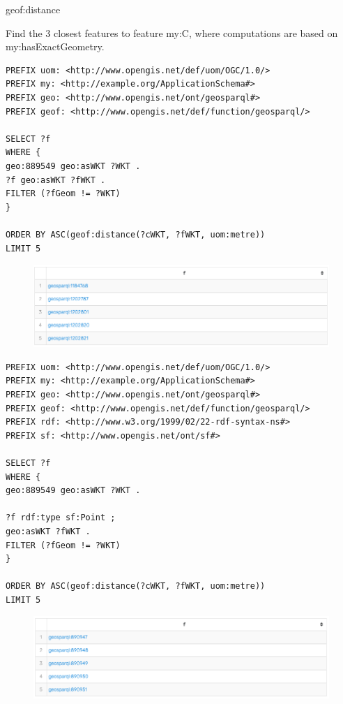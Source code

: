 geof:distance

Find the 3 closest features to feature my:C, where computations are based on my:hasExactGeometry.

\begin{lstlisting}
PREFIX uom: <http://www.opengis.net/def/uom/OGC/1.0/>
PREFIX my: <http://example.org/ApplicationSchema#>
PREFIX geo: <http://www.opengis.net/ont/geosparql#>
PREFIX geof: <http://www.opengis.net/def/function/geosparql/>

SELECT ?f
WHERE {
geo:889549 geo:asWKT ?WKT .
?f geo:asWKT ?fWKT .
FILTER (?fGeom != ?WKT)
}

ORDER BY ASC(geof:distance(?cWKT, ?fWKT, uom:metre))
LIMIT 5
\end{lstlisting}

\begin{figure}[H]
	\centering
	\includegraphics[width=0.7\linewidth]{imagenes/capitulo4/salida8}
	\caption{}
	\label{fig:salida8}
\end{figure}


\begin{lstlisting}
PREFIX uom: <http://www.opengis.net/def/uom/OGC/1.0/>
PREFIX my: <http://example.org/ApplicationSchema#>
PREFIX geo: <http://www.opengis.net/ont/geosparql#>
PREFIX geof: <http://www.opengis.net/def/function/geosparql/>
PREFIX rdf: <http://www.w3.org/1999/02/22-rdf-syntax-ns#>
PREFIX sf: <http://www.opengis.net/ont/sf#>

SELECT ?f
WHERE {
geo:889549 geo:asWKT ?WKT .

?f rdf:type sf:Point ;
geo:asWKT ?fWKT .
FILTER (?fGeom != ?WKT)
}

ORDER BY ASC(geof:distance(?cWKT, ?fWKT, uom:metre))
LIMIT 5
\end{lstlisting}

\begin{figure}[H]
	\centering
	\includegraphics[width=0.7\linewidth]{imagenes/capitulo4/salida9}
	\caption{}
	\label{fig:salida9}
\end{figure}

